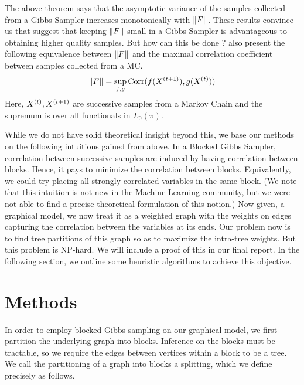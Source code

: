 \documentclass{article} %
\begin{document}
The above theorem says that the asymptotic variance of the samples collected
from a Gibbs Sampler increases monotonically with $\left\|F\right\|$. These results
convince us that suggest that keeping $\left\|F\right\|$ small in a Gibbs Sampler is
advantageous to obtaining higher quality samples. But how can this be done ?
\cite{liu01mcmcscicomp} also present the following equivalence between $\left\|F\right\|$
and the maximal correlation coefficient between samples collected from a MC.
\begin{equation}
\|F\| = \sup_{f,g} \text{Corr}(f(X^{(t+1)}), g(X^{(t)}))
\end{equation}
Here, $X^{(t)}, X^{(t+1)}$ are successive samples from a Markov Chain and the
supremum is over all functionals in $L_0(\pi)$.

While we do not have solid theoretical insight beyond this, we base our methods
on the following intuitions gained from above. In a Blocked Gibbs Sampler,
correlation between successive samples are induced by having correlation between
blocks. Hence, it pays to minimize the correlation between blocks. Equivalently,
we could try placing all strongly correlated variables in the same block. (We
note that this intuition is not new in the Machine Learning community, but we
were not able to find a precise theoretical formulation of this notion.) Now
given,
a graphical model, we now treat it as a weighted graph with the weights on edges
capturing the correlation between the variables at its ends. Our problem now is
to find tree partitions of this graph so as to maximize the intra-tree weights.
But this problem is NP-hard. We will include a proof of this in our final
report. In the following section, we outline some heuristic
algorithms to achieve this objective.


\section{Methods}

In order to employ blocked Gibbs sampling on our graphical model, we first partition the underlying graph into blocks. Inference on the blocks must be tractable, so we require the edges between vertices within a block to be a tree. We call the partitioning of a graph into blocks a splitting, which we define precisely as follows.
\end{document}
